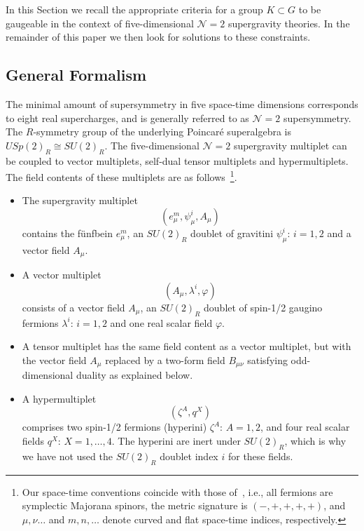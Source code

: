 \documentclass[a4paper,11pt]{article}
\begin{document}
In this Section we recall the appropriate criteria for a group $K\subset G
$ to be gaugeable in the context of five-dimensional $\mathcal{N}=2$
supergravity theories. In the remainder of this paper we then look
for solutions to these constraints. 


\subsection{General Formalism}

The minimal amount of supersymmetry in five space-time dimensions
corresponds to eight real supercharges, and is generally referred to as
$\mathcal{N}=2$ supersymmetry. The $R$-symmetry group of the underlying
Poincar\'{e} superalgebra is $USp(2)_R\cong SU(2)_R$.  The
five-dimensional $\mathcal{N}=2$ supergravity multiplet can be coupled to
vector multiplets, self-dual tensor multiplets and hypermultiplets. The
field contents of these multiplets are as follows~\footnote{Our space-time
conventions coincide with those of~\cite{GST1,GST2,GZ1,CD}, i.e., all
fermions are symplectic Majorana spinors, the metric signature is
$(-,+,+,+,+)$, and $\mu,\nu\ldots$ and $m,n,\ldots$ denote curved and flat
space-time indices, respectively.}.

\begin{itemize}
\item The supergravity multiplet
\begin{displaymath}
(e_{\mu}^m,\psi_{\mu}^i,A_{\mu})
\end{displaymath}
contains the f\"{u}nfbein $e_{\mu}^m$, an $SU(2)_R$ doublet of
gravitini $\psi_{\mu}^i$: $i=1,2$ and a vector field $A_{\mu}$.

\item A vector multiplet
\begin{displaymath}
(A_{\mu},\lambda^i,\varphi)
\end{displaymath}
consists of a vector field $A_{\mu}$, an $SU(2)_R$ doublet of spin-1/2
gaugino fermions $\lambda^i$: $i =1,2$ and one real
scalar field $\varphi$.

\item A tensor  multiplet
has the same field content as a vector multiplet, but with the vector
field $A_{\mu}$ replaced by a two-form field $B_{\mu\nu}$ satisfying
odd-dimensional duality as explained below.

\item A hypermultiplet
\begin{displaymath}
(\zeta^A,q^X)
\end{displaymath}
comprises two spin-1/2 fermions (hyperini) $\zeta^A$:
$A=1,2$, and four real scalar fields $q^X$: $X=1,\ldots,4$.
The hyperini are inert under $SU(2)_R$, which is why we have
not used the $SU(2)_R$ doublet index $i$ for these fields.
\end{itemize}
\end{document}
